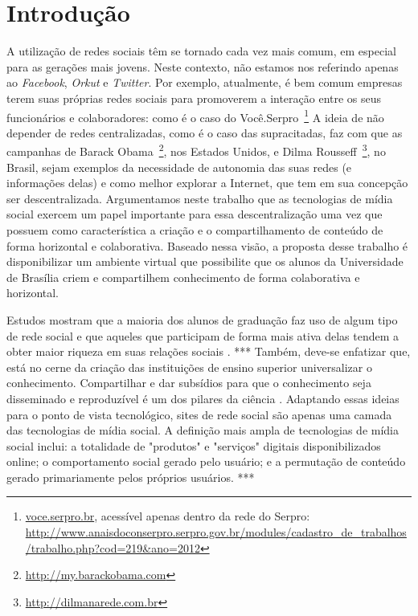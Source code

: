 \chapter{Introdução}
 
A utilização de redes sociais têm se tornado cada vez mais comum, em especial
para as gerações mais jovens. Neste contexto, não estamos nos
referindo apenas ao \textit{Facebook}, \textit{Orkut} e \textit{Twitter}. 
%
Por exemplo, atualmente, é bem comum empresas terem suas próprias redes sociais para
promoverem a interação entre os seus funcionários e colaboradores: como é o caso do
Você.Serpro~\footnote{\url{voce.serpro.br}, acessível apenas dentro da rede do Serpro:
\url{http://www.anaisdoconserpro.serpro.gov.br/modules/cadastro_de_trabalhos/trabalho.php?cod=219&ano=2012}}
%
A ideia de não depender de redes centralizadas, como é o caso das supracitadas, faz com que
as campanhas de Barack Obama~\footnote{\url{http://my.barackobama.com}}, nos
Estados Unidos, e Dilma Rousseff~\footnote{\url{http://dilmanarede.com.br}}, no
Brasil, sejam exemplos da necessidade de autonomia das suas redes
(e informações delas) e como melhor explorar a Internet, que tem em sua
concepção ser descentralizada. 
Argumentamos neste trabalho que as tecnologias de mídia social exercem um papel importante para 
essa descentralização uma vez que possuem como característica a criação e o
compartilhamento de conteúdo de forma horizontal e colaborativa. 
%
Baseado nessa visão, a proposta desse trabalho é disponibilizar um ambiente
virtual que possibilite que os alunos da Universidade de Brasília criem e
compartilhem conhecimento de forma colaborativa e horizontal.
 
Estudos mostram que a maioria dos alunos de graduação faz uso de algum
tipo de rede social e que aqueles que participam de forma mais ativa delas
tendem a obter maior riqueza em suas relações sociais \cite{???}.  ***
%
Também, deve-se enfatizar que, está no cerne da criação das instituições de
ensino superior universalizar o conhecimento. Compartilhar e dar subsídios para
que o conhecimento seja disseminado e reproduzível é um dos pilares da ciência
\cite{Kon2011}.
%
%
Adaptando essas ideias para o ponto de vista tecnológico, sites de rede social
são apenas uma camada das tecnologias de mídia social. A definição mais ampla de
tecnologias de mídia social inclui: a totalidade de "produtos" e "serviços"
digitais disponibilizados online; o comportamento social gerado pelo usuário; e
a permutação de conteúdo gerado primariamente pelos próprios usuários.
\cite{???} ***
 

